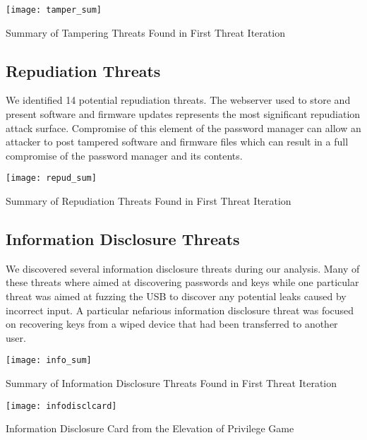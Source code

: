 \begin{table*}[]
    \centering
    \texttt{[image: tamper\_sum]}
    \caption{Summary of Tampering Threats Found in First Threat Iteration}
    \label{tab:tampersum}
\end{table*}

\subsection{Repudiation Threats}


We identified 14 potential repudiation threats.   The webserver used to store and present software and firmware updates represents the most significant repudiation attack surface.  Compromise of this element of the password manager can allow an attacker to post tampered software and firmware files which can result in a full compromise of the password manager and its contents.
\begin{table*}[]
    \centering
    \texttt{[image: repud\_sum]}
    \caption{Summary of Repudiation Threats Found in First Threat Iteration}
    \label{tab:repudsum}
\end{table*}



\subsection{Information Disclosure Threats}
We discovered several information disclosure threats during our analysis.  Many of these threats where aimed at discovering passwords and keys while one particular threat was aimed at fuzzing the USB to discover any potential leaks caused by incorrect input.  A particular nefarious information disclosure threat was focused on recovering keys from a wiped device that had been transferred to another user.  

\begin{table*}[]
    \centering
    \texttt{[image: info\_sum]}
    \caption{Summary of Information Disclosure Threats Found in First Threat Iteration}
    \label{tab:infosum}
\end{table*}

\begin{marginfigure}[0.25in]%
\centering
  \texttt{[image: infodisclcard]}
  \caption{Information Disclosure Card from the Elevation of Privilege Game}
  \label{fig:spoofcard}
\end{marginfigure}


